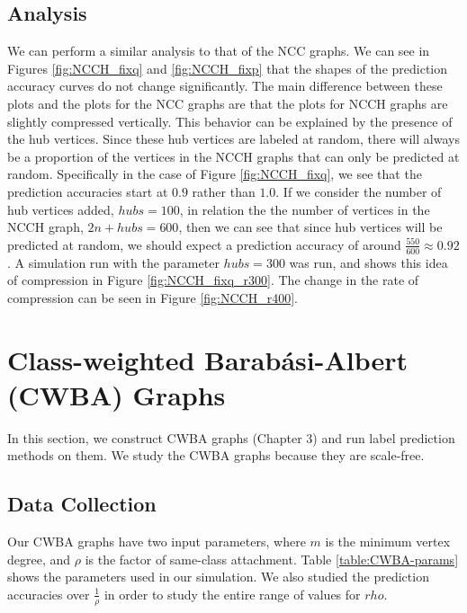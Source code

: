 \subsection{Analysis}
We can perform a similar analysis to that of the NCC graphs. We can see
in Figures \ref{fig:NCCH_fixq} and \ref{fig:NCCH_fixp} that the shapes of 
the prediction accuracy curves do not change significantly. The main
difference between these plots and the plots for the NCC graphs are that
the plots for NCCH graphs are slightly compressed vertically. This behavior
can be explained by the presence of the hub vertices. Since these hub
vertices are labeled at random, there will always be a proportion of the
vertices in the NCCH graphs that can only be predicted at random. 
Specifically in the case of Figure \ref{fig:NCCH_fixq}, we see that the
prediction accuracies start at $0.9$ rather than $1.0$. If we consider the
number of hub vertices added, $hubs=100$, in relation the the number of
vertices in the NCCH graph, $2n + hubs = 600$, then we can see that since
hub vertices will be predicted at random, we should expect a prediction
accuracy of around $\frac{550}{600} \approx 0.92$. A simulation run with
the parameter $hubs=300$ was run, and shows this idea of compression in
Figure \ref{fig:NCCH_fixq_r300}. The change in the rate of compression can
be seen in Figure \ref{fig:NCCH_r400}.

\section{Class-weighted Barab\'{a}si-Albert (CWBA) Graphs}
In this section, we construct CWBA graphs (Chapter 3) and run label
prediction methods on them. We study the CWBA graphs because they are
scale-free.

\subsection{Data Collection}
Our CWBA graphs have two input parameters, where $m$ is the minimum vertex
degree, and $\rho$ is the factor of same-class attachment. Table
\ref{table:CWBA-params} shows the parameters used in our simulation. We
also studied the prediction accuracies over $\frac{1}{\rho}$ in order to
study the entire range of values for $rho$.

